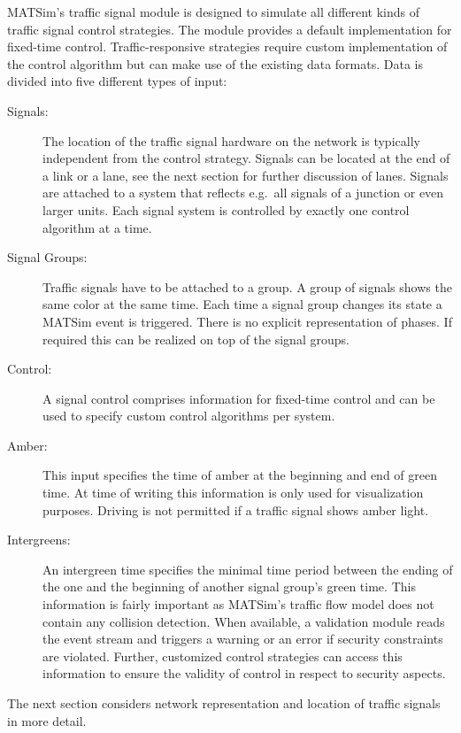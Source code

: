 MATSim's traffic signal module is designed to simulate all different kinds of traffic signal control strategies. 
The module provides a default implementation for fixed-time control. 
Traffic-responsive strategies require custom implementation of the control algorithm but can make use of the existing data formats. 
Data is divided into five different types of input:
\begin{description}
	\item[Signals:] The location of the traffic signal hardware on the network is typically independent from the control strategy. Signals can be located at the end of a link or a lane, see the next section for further discussion of lanes. Signals are attached to a system that reflects e.g.~all signals of a junction or even larger units. Each signal system is controlled by exactly one control algorithm at a time.  
	\item[Signal Groups:] Traffic signals have to be attached to a group. A group of signals shows the same color at the same time. Each time a signal group changes its state a MATSim event is triggered. 
		There is no explicit representation of phases. If required this can be realized on top of the signal groups.  
	\item[Control:] A signal control comprises information for fixed-time control and can be used to specify custom control algorithms per system. 
	\item[Amber:] This input specifies the time of amber at the beginning and end of green time. At time of writing this information is only used for visualization purposes. 
		Driving is not permitted if a traffic signal shows amber light. 
	\item[Intergreens:] An intergreen time specifies the minimal time period between the ending of the one and the beginning of another signal group's green time.  
		This information is fairly important as MATSim's traffic flow model does not contain any collision detection. 
		When available, a validation module reads the event stream and triggers a warning or an error if security constraints are violated. 
		Further, customized control strategies can access this information to ensure the validity of control in respect to security aspects.    
\end{description}

The next section considers network representation and location of traffic signals in more detail. 

